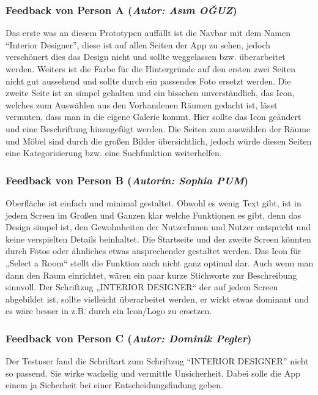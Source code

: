 \documentclass[12pt,paper=a4,oneside,hidelinks,headings=small,captions=heading,captions=nooneline]{scrartcl}
\begin{document}
\subsubsection{\textbf{Feedback von Person A} (\emph{Autor: Asım OĞUZ})}
\label{sec:org3b182da}

Das erste was an diesem Prototypen auffällt ist die Navbar mit dem
Namen “Interior Designer”, diese ist auf allen Seiten der App zu
sehen, jedoch verschönert dies das Design nicht und sollte weggelassen
bzw. überarbeitet werden. Weiters ist die Farbe für die Hintergründe
auf den ersten zwei Seiten nicht gut aussehend und sollte durch ein
passendes Foto ersetzt werden. Die zweite Seite ist zu simpel gehalten
und ein bisschen unverständlich, das Icon, welches zum Auswählen aus
den Vorhandenen Räumen gedacht ist, lässt vermuten, dass man in die
eigene Galerie kommt. Hier sollte das Icon geändert und eine
Beschriftung hinzugefügt werden. Die Seiten zum auswählen der Räume
und Möbel sind durch die großen Bilder übersichtlich, jedoch würde
diesen Seiten eine Kategorisierung bzw. eine Suchfunktion
weiterhelfen.

\subsubsection{\textbf{Feedback von Person B} (\emph{Autorin: Sophia PUM})}
\label{sec:orgb9a7811}

Oberfläche ist einfach und minimal gestaltet. Obwohl es wenig Text gibt, ist in jedem Screen im Großen und Ganzen klar welche Funktionen es gibt, denn das Design simpel ist, den Gewohnheiten der NutzerInnen und Nutzer entspricht und keine verspielten Details beinhaltet.  Die Startseite und der zweite Screen könnten durch Fotos oder ähnliches etwas ansprechender gestaltet werden. Das Icon für „Select a Room“ stellt die Funktion auch nicht ganz optimal dar. Auch wenn man dann den Raum einrichtet, wären ein paar kurze Stichworte zur Beschreibung sinnvoll. Der Schriftzug „INTERIOR DESIGNER“ der auf jedem Screen abgebildet ist, sollte vielleicht überarbeitet werden, er wirkt etwas dominant und es wäre besser in z.B. durch ein Icon/Logo zu ersetzen.
\subsubsection{\textbf{Feedback von Person C} (\emph{Autor: Dominik Pegler})}
\label{sec:orga6281de}

Der Testuser fand die Schriftart zum Schriftzug "`INTERIOR DESIGNER"'
nicht so passend. Sie wirke wackelig und vermittle Unsicherheit. Dabei
solle die App einem ja Sicherheit bei einer Entscheidungsfindung
geben.
\end{document}
